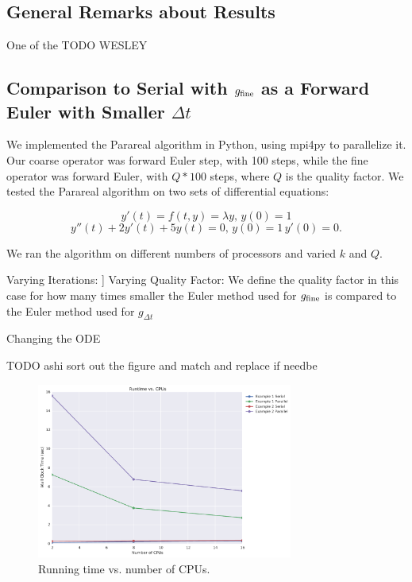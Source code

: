 \documentclass[letterpaper,12pt]{article}
\begin{document}
\subsection{General Remarks about Results}
One of the TODO WESLEY

\subsection{Comparison to Serial with $g_{\textnormal{fine}}$ as a Forward Euler with
Smaller $\Delta t$}

We implemented the Parareal algorithm in Python, using mpi4py to parallelize it.
Our coarse operator was forward Euler step, with 100 steps, while the fine
operator was forward Euler, with $Q * 100$ steps, where $Q$ is the quality
factor. We tested the Parareal algorithm on two sets of differential equations:

\[
y'(t) = f(t, y) = \lambda y, \, y(0) = 1
\]
\[
y''(t) + 2y'(t) + 5y(t) = 0, \, y(0) = 1 \, y'(0) = 0.
\]

We ran the algorithm on different numbers of processors and varied $k$ and $Q$. 

Varying Iterations:
]
Varying Quality Factor:
We define the quality factor in this case for how many times smaller the Euler method used for $g_{\textnormal{fine}}$ is compared to the Euler method used for $g_{\Delta t}$

Changing the ODE

TODO ashi sort out the figure and match and replace if needbe

\begin{figure}
\begin{center}
\includegraphics[width=0.75\textwidth]{data/runtime_vs_cpus.pdf}
\caption{Running time vs. number of CPUs.}
\label{fig:run_v_cpu}
\end{center}
\end{figure}
\end{document}
